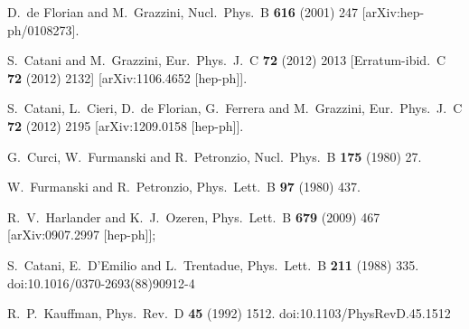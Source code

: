 \documentclass[12pt]{article}
\begin{document}
\begin{thebibliography}{99}
  D.~de Florian and M.~Grazzini,
  Nucl.\ Phys.\  B {\bf 616} (2001) 247
[arXiv:hep-ph/0108273].
 
  S.~Catani and M.~Grazzini,
  Eur.\ Phys.\ J.\ C {\bf 72} (2012) 2013
[Erratum-ibid.\ C {\bf 72} (2012) 2132]
[arXiv:1106.4652 [hep-ph]].

  S.~Catani, L.~Cieri, D.~de Florian, G.~Ferrera and M.~Grazzini,
  Eur.\ Phys.\ J.\ C {\bf 72} (2012) 2195
  [arXiv:1209.0158 [hep-ph]].
 
  

  G.~Curci, W.~Furmanski and R.~Petronzio,
  Nucl.\ Phys.\ B {\bf 175} (1980) 27.

  W.~Furmanski and R.~Petronzio,
  Phys.\ Lett.\ B {\bf 97} (1980) 437.


  R.~V.~Harlander and K.~J.~Ozeren,
  Phys.\ Lett.\ B {\bf 679} (2009) 467
  [arXiv:0907.2997 [hep-ph]];

  
  S.~Catani, E.~D'Emilio and L.~Trentadue,
  Phys.\ Lett.\ B {\bf 211} (1988) 335.
  doi:10.1016/0370-2693(88)90912-4

  R.~P.~Kauffman,
  Phys.\ Rev.\ D {\bf 45} (1992) 1512.
  doi:10.1103/PhysRevD.45.1512


\end{thebibliography}
\end{document}
